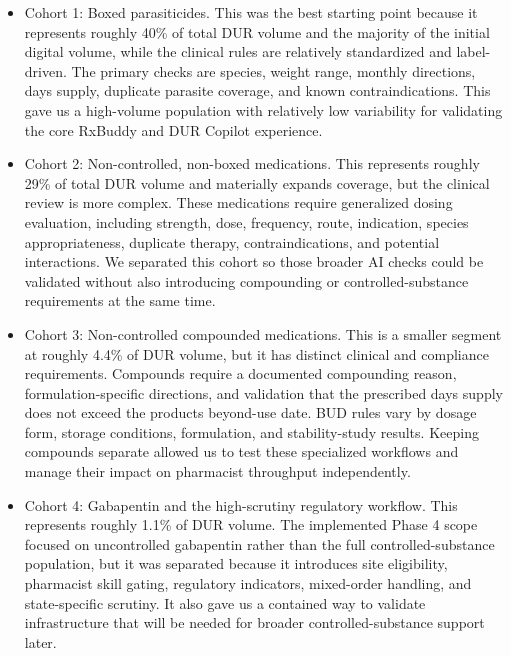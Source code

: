 \documentclass[
]{article}
\begin{document}
\begin{itemize}
\item
  Cohort 1: Boxed parasiticides. This was the best starting point
  because it represents roughly 40\% of total DUR volume and the
  majority of the initial digital volume, while the clinical rules are
  relatively standardized and label-driven. The primary checks are
  species, weight range, monthly directions, days\textquotesingle{}
  supply, duplicate parasite coverage, and known contraindications. This
  gave us a high-volume population with relatively low variability for
  validating the core RxBuddy and DUR Copilot experience.
\item
  Cohort 2: Non-controlled, non-boxed medications. This represents
  roughly 29\% of total DUR volume and materially expands coverage, but
  the clinical review is more complex. These medications require
  generalized dosing evaluation, including strength, dose, frequency,
  route, indication, species appropriateness, duplicate therapy,
  contraindications, and potential interactions. We separated this
  cohort so those broader AI checks could be validated without also
  introducing compounding or controlled-substance requirements at the
  same time.
\item
  Cohort 3: Non-controlled compounded medications. This is a smaller
  segment at roughly 4.4\% of DUR volume, but it has distinct clinical
  and compliance requirements. Compounds require a documented
  compounding reason, formulation-specific directions, and validation
  that the prescribed days\textquotesingle{} supply does not exceed the
  product\textquotesingle s beyond-use date. BUD rules vary by dosage
  form, storage conditions, formulation, and stability-study results.
  Keeping compounds separate allowed us to test these specialized
  workflows and manage their impact on pharmacist throughput
  independently.
\item
  Cohort 4: Gabapentin and the high-scrutiny regulatory workflow. This
  represents roughly 1.1\% of DUR volume. The implemented Phase 4 scope
  focused on uncontrolled gabapentin rather than the full
  controlled-substance population, but it was separated because it
  introduces site eligibility, pharmacist skill gating, regulatory
  indicators, mixed-order handling, and state-specific scrutiny. It also
  gave us a contained way to validate infrastructure that will be needed
  for broader controlled-substance support later.
\end{itemize}
\end{document}
